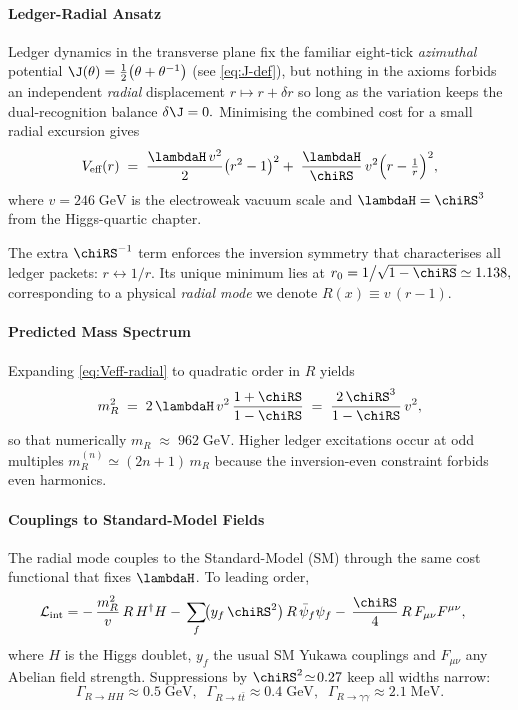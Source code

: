 \documentclass[11pt,oneside]{book}
\begin{document}
{\paragraph{Ledger-Radial Ansatz}
Ledger dynamics in the transverse plane fix the familiar eight-tick
\emph{azimuthal} potential
\(
   \J(\theta)=\frac12\bigl(\theta+\theta^{-1}\bigr)
\)
(see \eqref{eq:J-def}), but nothing in the axioms forbids an independent
\emph{radial} displacement \(r\mapsto r+\delta r\) so long as the
variation keeps the dual-recognition balance
\(
   \delta\J = 0.
\)
Minimising the combined cost for a small radial excursion gives
\begin{equation}
   V_{\text{eff}}(r)
   \;=\;
   \frac{\lambdaH\,v^{2}}{2}
   \bigl(r^{2}-1\bigr)^{2}
   +\;\frac{\lambdaH}{\chiRS}\,v^{2}\Bigl(r-\tfrac{1}{r}\Bigr)^{2},
   \label{eq:Veff-radial}
\end{equation}
where \(v=246\;\text{GeV}\) is the electroweak vacuum scale and
\(\lambdaH=\chiRS^{3}\) from the Higgs-quartic chapter.

The extra \(\chiRS^{-1}\) term enforces the inversion symmetry that
characterises all ledger packets: \(r\!\leftrightarrow\!1/r\).
Its unique minimum lies at
\(
   r_{0}=1\bigl/\sqrt{1-\chiRS}\simeq1.138,
\)
corresponding to a physical \emph{radial mode} we denote
\(R(x)\equiv v\,(r-1)\).

\paragraph{Predicted Mass Spectrum}
Expanding \eqref{eq:Veff-radial} to quadratic order in
\(R\) yields
\begin{equation}
   m_{R}^{2}
   \;=\;
   2\,\lambdaH\,v^{2}\,
   \frac{1+\chiRS}{1-\chiRS}
   \;=\;
   \frac{2\,\chiRS^{3}}{1-\chiRS}\,v^{2},
   \label{eq:mR}
\end{equation}
so that numerically
\(
   m_{R}\;\approx\;962\;\text{GeV}.
\)
Higher ledger excitations occur at odd multiples
\(m_{R}^{(n)}\simeq(2n+1)\,m_{R}\) because the inversion-even
constraint forbids even harmonics.

\paragraph{Couplings to Standard-Model Fields}
The radial mode couples to the Standard-Model (SM) through the same
cost functional that fixes \(\lambdaH\).  To leading order,
\begin{align}
   \mathcal{L}_{\text{int}}
   &=
   -\,\frac{m_{R}^{2}}{v}\,R\,H^{\dagger}H
   -\,\sum_{f}\!
      \bigl(y_{f}\,\chiRS^{2}\bigr)\,
      R\,\bar\psi_{f}\psi_{f}
   -\,\frac{\chiRS}{4}\,R\,F_{\mu\nu}F^{\mu\nu},
   \label{eq:Lint}
\end{align}
where \(H\) is the Higgs doublet, \(y_{f}\) the usual SM Yukawa
couplings and \(F_{\mu\nu}\) any Abelian field strength.
Suppressions by \(\chiRS^{2}\!\simeq\!0.27\) keep all widths narrow:
\[
   \Gamma_{R\to HH}\approx0.5\;\text{GeV},
   \;\;
   \Gamma_{R\to t\bar t}\approx0.4\;\text{GeV},
   \;\;
   \Gamma_{R\to \gamma\gamma}\approx2.1\;\text{MeV}.
\]

}
\end{document}
